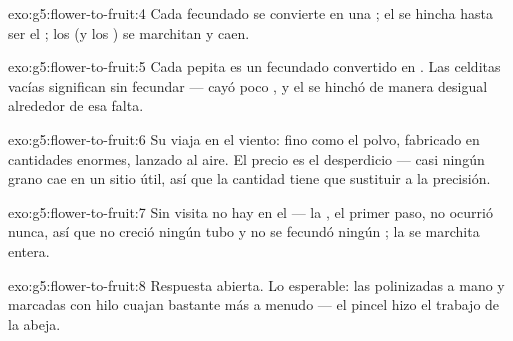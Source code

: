 \begin{solution}{exo:g5:flower-to-fruit:4}
Cada  fecundado se convierte en una ; el  se hincha
hasta ser el ; los  (y los ) se marchitan y caen.
\end{solution}

\begin{solution}{exo:g5:flower-to-fruit:5}
Cada pepita es un  fecundado convertido en . Las celditas
vacías significan  sin fecundar --- cayó poco , y el 
se hinchó de manera desigual alrededor de esa falta.
\end{solution}

\begin{solution}{exo:g5:flower-to-fruit:6}
Su  viaja en el viento: fino como el polvo, fabricado en
cantidades enormes, lanzado al aire. El precio es el desperdicio ---
casi ningún grano cae en un sitio útil, así que la cantidad tiene que
sustituir a la precisión.
\end{solution}

\begin{solution}{exo:g5:flower-to-fruit:7}
Sin visita no hay  en el  --- la , el primer
paso, no ocurrió nunca, así que no creció ningún tubo y no se fecundó
ningún ; la  se marchita entera.
\end{solution}

\begin{solution}{exo:g5:flower-to-fruit:8}
Respuesta abierta. Lo esperable: las  polinizadas a mano y
marcadas con hilo cuajan  bastante más a menudo --- el pincel
hizo el trabajo de la abeja.
\end{solution}

